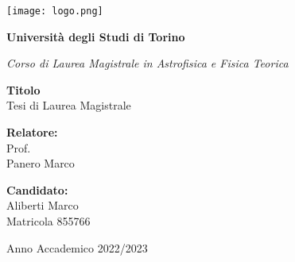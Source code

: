 \pagestyle{empty}
\begin{center}
    \texttt{[image: logo.png]}
    \vspace{0.5cm}\\
    {\LARGE\bfseries Università degli Studi di Torino \par}
	\vspace{0,3cm}
	{\Large\it Corso di Laurea Magistrale in Astrofisica e Fisica Teorica\par}
    \vspace{2cm}
	{\LARGE\bfseries Titolo}
	\vspace{0.3cm}\\
    {\Large Tesi di Laurea Magistrale}
	\vspace{0,5cm}
\end{center}
\vspace{2cm}
\begin{minipage}[t]{0.4\textwidth} %
    {\large{{\bf Relatore:}\\
        Prof.\\
        Panero Marco}}
\end{minipage}
\hfill
\begin{minipage}[t]{0.47\textwidth}\raggedleft %
    {\large{{\bf Candidato:}\\
        Aliberti Marco\\
        Matricola 855766}}
    \vspace{12mm}
\end{minipage}
\hfill
\vspace{18mm}
\begin{center} %
    \large{Anno Accademico 2022/2023}
\end{center} 
